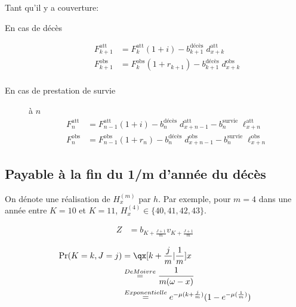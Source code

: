 \documentclass[10pt, french]{article}
\begin{document}
\begin{multicols*}{3}
Tant qu'il y a couverture:
\begin{description}

\item[En cas de décès]
	\begin{align*}
		F_{k + 1}^{\text{att}} &= F_{k}^{\text{att}}(1 + i) - b_{k + 1}^{\text{décès}} \; d_{x + k}^{\text{att}} \\
		F_{k + 1}^{\text{obs}} &= F_{k}^{\text{obs}}(1 + r_{k + 1}) - b_{k + 1}^{\text{décès}} \; d_{x + k}^{\text{obs}} \\
	\end{align*}
\item[En cas de prestation de survie] à $n$
	\begin{align*}
		F_{n}^{\text{att}} &= F_{n - 1}^{\text{att}}(1 + i) - b_{n}^{\text{décès}} \; d_{x + n - 1}^{\text{att}} - b_{n}^{\text{survie}} \; \ell_{x + n}^{\text{att}} \\
		F_{n}^{\text{obs}} &= F_{n - 1}^{\text{obs}}(1 + r_{n}) - b_{n}^{\text{décès}} \; d_{x + n - 1}^{\text{obs}} - b_{n}^{\text{survie}} \; \ell_{x + n}^{\text{obs}}
	\end{align*}
\end{description}



\columnbreak
\subsection{Payable à la fin du 1/m d'année du décès}

On dénote une réalisation de $H^{(m)}_x$ par $h$. Par exemple, pour $m = 4$ dans une année entre $K = 10$ et $K = 11$, $H^{(4)}_x \in \{40, 41, 42, 43\}$.

\begin{align*}
	Z 		
	&=	b_{K + \frac{J + 1}{m}} v_{K + \frac{J + 1}{m}} 
\end{align*}

\begin{align*}
	\text{Pr}(K = k, J = j) 
	&=	\qx[k + \frac{j}{m} | \frac{1}{m}]{x} \\
	&\stackrel{De Moivre}=	\frac{1}{m(\omega - x)} \\
	&\stackrel{Exponentielle}=	e^{-\mu(k + \frac{j}{m})}(1 - e^{-\mu(\frac{1}{m})})
\end{align*}


\end{multicols*}
\end{document}
